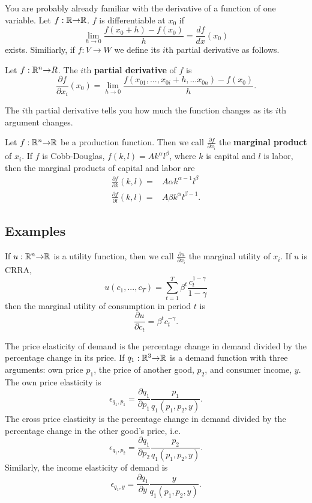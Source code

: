 You are probably already familiar with the derivative of a function of
one variable. Let $f: \mathbb{R} {\rightarrow} \mathbb{R}$. $f$ is differentiable at $x_0$ if 
\[ \lim_{h \to 0} \frac{f(x_0 + h) - f(x_0)}{h} = \frac{d
  f}{dx}(x_0) \]
exists. Similiarly, if $f: V \to W$ we define its $i$th partial
derivative as follows.
\begin{definition}
  Let $f:\mathbb{R}^n {\rightarrow} R$. The $i$th \textbf{partial derivative} of $f$ is 
  \[ \frac{\partial f}{\partial x_i} (x_0) = \lim_{h \to 0}
  \frac{f(x_{01},...,x_{0i}+h, ... x_{0n}) - f(x_0) }{h}. \]
\end{definition}
The $i$th partial derivative tells you how much the function changes
as its $i$th argument changes.
\begin{example}
  Let $f:\mathbb{R}^n {\rightarrow} \mathbb{R}$ be a production function. Then we call
  $\frac{\partial f}{\partial x_i}$ the \textbf{marginal product} of
  $x_i$. If $f$ is Cobb-Douglas, $f(k,l) = Ak^\alpha l^\beta$, where
  $k$ is capital and $l$ is labor, then the marginal products of
  capital and labor are
  \begin{align*}
    \frac{\partial f}{\partial k} (k,l) = & A \alpha k^{\alpha-1}
    l^\beta \\
    \frac{\partial f}{\partial l} (k,l) = & A \beta k^{\alpha}
    l^{\beta -1}.
  \end{align*}
\end{example}

\subsection{Examples}
\begin{example}
  If $u:\mathbb{R}^n {\rightarrow} \mathbb{R}$ is a utility function, then we call
  $\frac{\partial u}{\partial x_i}$ the marginal utility of $x_i$.  
  If $u$ is CRRA, 
  \[u(c_1,...,c_T) =
  \sum_{t=1}^T \beta^t \frac{c_t^{1-\gamma}}{1-\gamma} \]
  then  the marginal utility of consumption in period $t$ is 
  \[ \frac{\partial u}{\partial c_t} = \beta^t c_t^{-\gamma}. \]
\end{example}

\begin{example}
  The price elasticity of demand is the percentage change in demand
  divided by the percentage change in its price. If $q_1:\mathbb{R}^3 {\rightarrow} \mathbb{R}$ is
  a demand function with three arguments: own price $p_1$, the price
  of another good, $p_2$, and consumer income, $y$.  The own price
  elasticity is 
  \[ \epsilon_{q_1,p_1} = \frac{\partial q_1}{\partial p_1}
  \frac{p_1}{q_1(p_1,p_2,y)}. \]
  The cross price elasticity is the percentage change in demand
  divided by the percentage change in the other good's price, i.e.
  \[ \epsilon_{q_1,p_2} = \frac{\partial q_1}{\partial p_2}
  \frac{p_2}{q_1(p_1,p_2,y)}. \]
  Similarly, the income elasticity of demand is
  \[ \epsilon_{q_1,y} = \frac{\partial q_1}{\partial y}
  \frac{y}{q_1(p_1,p_2,y)}. \]
\end{example}

